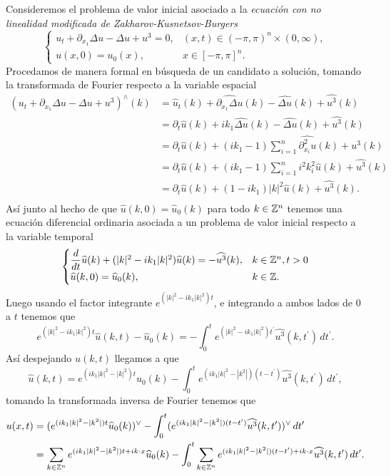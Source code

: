 Consideremos el problema de valor inicial asociado a la \textit{ecuación con no linealidad modificada de Zakharov-Kusnetsov-Burgers}
\begin{equation}\label{ZKB}
    \begin{cases}
    u_t+\partial_{x_1}\Delta u-\Delta u+u^3=0, & (x,t)\in(-\pi,\pi)^n\times(0,\infty),\\
    u(x,0)=u_0(x), & x\in[-\pi,\pi]^n.
\end{cases}
\end{equation}
Procedamos de manera formal en búsqueda de un candidato a solución, tomando la transformada de Fourier respecto a la variable espacial
\begin{align*}
   (u_t+\partial_{x_1}\Delta u-\Delta u+u^3)^{\wedge}(k)&= \widehat{u}_t(k)+\widehat{\partial_{x_1}\Delta u}(k)-\widehat{\Delta u}(k)+\widehat{u^3}(k)\\
   &=\partial_t\widehat{u}(k)+ik_1\widehat{\Delta u}(k)-\widehat{\Delta u}(k)+\widehat{u^3}(k)\\
   &=\partial_t\widehat{u}(k)+(ik_1-1)\sum_{i=1}^n\widehat{\partial^2_{x_i}u}(k)+\widehat{u^3}(k)\\
   &=\partial_t\widehat{u}(k)+(ik_1-1)\sum_{i=1}^ni^2k_i^2\widehat{u}(k)+\widehat{u^3}(k)\\
   &=\partial_t\widehat{u}(k)+(1-ik_1)|k|^2\widehat{u}(k)+\widehat{u^3}(k).\\
\end{align*}
Así junto al hecho de que $\widehat{u}(k,0)=\widehat{u}_0(k)$ para todo $k\in\mathbb{Z}^n$ tenemos una ecuación diferencial ordinaria asociada a un problema de valor inicial respecto a la variable temporal 
$$\begin{cases}
    \dfrac{d}{dt}\widehat{u}(k)+(|k|^2-ik_1|k|^2)\widehat{u}(k)=-\widehat{u^3}(k), & k\in\mathbb{Z}^n,t>0\\
    \widehat{u}(k,0)=\widehat{u}_0(k), &k\in\mathbb{Z}.
\end{cases}$$
Luego usando el factor integrante $e^{(|k|^2-ik_1|k|^2)t}$, e integrando a ambos lados de 0 a $t$ tenemos que
$$e^{(|k|^2-ik_1|k|^2)t}\widehat{u}(k,t)-\widehat{u}_0(k)=-\int_0^te^{(|k|^2-ik_1|k|^2)t^\prime}\widehat{u^3}(k,t^\prime)\,dt^\prime.$$
Así despejando $\widehat{u}(k,t)$ llegamos a que
$$\widehat{u}(k,t)=e^{(ik_1|k|^2-|k|^2)t}\widehat{u}_0(k)-\int_0^te^{(ik_1|k|^2-|k^2|)(t-t^\prime)}\widehat{u^3}(k,t^\prime)\,dt^\prime,$$
tomando la transformada inversa de Fourier tenemos que
\begin{align*}
    u(x,t)&=(e^{(ik_1|k|^2-|k^2|)t}\widehat{u}_0(k))^{\vee}-\int_0^t(e^{(ik_1|k|^2-|k^2|)(t-t^\prime)}\widehat{u^3}(k,t^\prime))^{\vee}\,dt^\prime\\
    &=\sum_{k\in\mathbb{Z}^n}e^{(ik_1|k|^2-|k^2|)t+ik\cdot x}\widehat{u}_0(k)-\int_0^t\sum_{k\in\mathbb{Z}^n}e^{(ik_1|k|^2-|k^2|)(t-t^\prime)+ik\cdot x}\widehat{u^3}(k,t^\prime)\,dt^\prime.
\end{align*}
